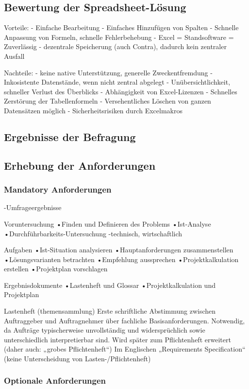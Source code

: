 \subsection{Bewertung der Spreadsheet-Lösung}


Vorteile:
- Einfache Bearbeitung
- Einfaches Hinzufügen von Spalten
- Schnelle Anpassung von Formeln, schnelle Fehlerbehebung
- Excel = Standsoftware = Zuverlässig
- dezentrale Speicherung (auch Contra), dadurch kein zentraler Ausfall

Nachteile:
- keine native Unterstützung, generelle Zweckentfremdung
- Inkosistente Datenstände, wenn nicht zentral abgelegt
- Unübersichtlichkeit, schneller Verlust des Überblicks 
- Abhängigkeit von Excel-Lizenzen
- Schnelles Zerstörung der Tabellenformeln
- Versehentliches Löschen von ganzen Datensätzen möglich
- Sicherheitsrisiken durch Excelmakros

\subsection{Ergebnisse der Befragung}

\subsection{Erhebung der Anforderungen}
\subsubsection{Mandatory Anforderungen}
-Umfrageergebnisse

Voruntersuchung
•Finden und Definieren des Problems
•Ist-Analyse
•Durchführbarkeits-Untersuchung
-technisch, wirtschaftlich

Aufgaben
•Ist-Situation analysieren
•Hauptanforderungen zusammenstellen
•Lösungsvarianten betrachten
•Empfehlung aussprechen
•Projektkalkulation erstellen
•Projektplan vorschlagen

Ergebnisdokumente
•Lastenheft und Glossar
•Projektkalkulation und Projektplan

Lastenheft (themensammlung)
Erste schriftliche Abstimmung zwischen Auftraggeber und Auftragnehmer über fachliche Basisanforderungen.
Notwendig, da Aufträge typischerweise unvollständig und widersprüchlich sowie unterschiedlich interpretierbar sind.
Wird später zum Pflichtenheft erweitert (daher auch: „grobes Pflichtenheft“)
Im Englischen „Requirements Specification“ (keine Unterscheidung von Lasten-/Pflichtenheft)

\subsubsection{Optionale Anforderungen}

